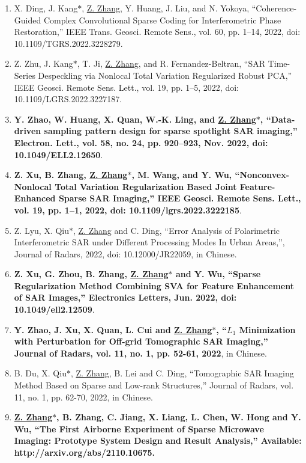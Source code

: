 \documentclass[paper=a4,fontsize=11pt]{scrartcl}
\begin{document}
\begin{enumerate}
	\item X. Ding, J. Kang$\ast$, \underline{Z. Zhang}, Y. Huang, J. Liu, and N. Yokoya, ``Coherence-Guided Complex Convolutional Sparse Coding for Interferometric Phase Restoration,'' IEEE Trans. Geosci. Remote Sens., vol. 60, pp. 1–14, 2022, doi: 10.1109/TGRS.2022.3228279.
	
	\item Z. Zhu, J. Kang$\ast$, T. Ji, \underline{Z. Zhang}, and R. Fernandez-Beltran, ``SAR Time-Series Despeckling via Nonlocal Total Variation Regularized Robust PCA,'' IEEE Geosci. Remote Sens. Lett., vol. 19, pp. 1–5, 2022, doi: 10.1109/LGRS.2022.3227187.​
	
	\item \textbf{Y. Zhao, W. Huang, X. Quan, W.-K. Ling, and \underline{Z. Zhang$\ast$}, ``Data-driven sampling pattern design for sparse spotlight SAR imaging,'' Electron. Lett., vol. 58, no. 24, pp. 920–923, Nov. 2022, doi: 10.1049/ELL2.12650}.
	
	\item \textbf{Z. Xu, B. Zhang, \underline{Z. Zhang$\ast$}, M. Wang, and Y. Wu, ``Nonconvex-Nonlocal Total Variation Regularization Based Joint Feature-Enhanced Sparse SAR Imaging,'' IEEE Geosci. Remote Sens. Lett., vol. 19, pp. 1–1, 2022, doi: 10.1109/lgrs.2022.3222185}.
	
	\item Z. Lyu, X. Qiu$\ast$, \underline{Z. Zhang} and C. Ding, ``Error Analysis of Polarimetric Interferometric SAR under Different Processing Modes In Urban Areas,'', Journal of Radars, 2022, doi: 10.12000/JR22059, in Chinese.
	
	\item \textbf{Z. Xu, G. Zhou, B. Zhang, \underline{Z. Zhang$\ast$} and Y. Wu, ``Sparse Regularization Method Combining SVA for Feature Enhancement of SAR Images,'' Electronics Letters, Jun. 2022, doi: 10.1049/ell2.12509}.
	
	\item \textbf{Y. Zhao, J. Xu, X. Quan, L. Cui and \underline{Z. Zhang$\ast$}, ``$L_1$ Minimization with Perturbation for Off-grid Tomographic SAR Imaging,'' Journal of Radars, vol. 11, no. 1, pp. 52-61, 2022}, in Chinese.
	
	\item B. Du, X. Qiu$\ast$, \underline{Z. Zhang}, B. Lei and C. Ding, ``Tomographic SAR Imaging Method Based on Sparse and Low-rank Structures,'' Journal of Radars, vol. 11, no. 1, pp. 62-70, 2022, in Chinese.
	
	
	\item \textbf{\underline{Z. Zhang$\ast$}, B. Zhang, C. Jiang, X. Liang, L. Chen, W. Hong and Y. Wu, ``The First Airborne Experiment of Sparse Microwave Imaging: Prototype System Design and Result Analysis,'' Available: http://arxiv.org/abs/2110.10675.}
	

\end{enumerate}
\end{document}

